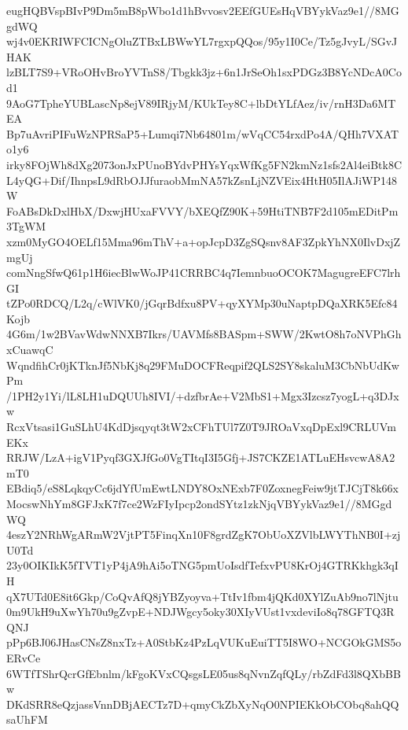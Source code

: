 eugHQBVspBIvP9Dm5mB8pWbo1d1hBvvosv2EEfGUEsHqVBYykVaz9e1//8MGgdWQ
wj4v0EKRIWFCICNgOluZTBxLBWwYL7rgxpQQos/95y1I0Ce/Tz5gJvyL/SGvJHAK
lzBLT7S9+VRoOHvBroYVTnS8/Tbgkk3jz+6n1JrSeOh1sxPDGz3B8YcNDcA0Cod1
9AoG7TpheYUBLascNp8ejV89IRjyM/KUkTey8C+lbDtYLfAez/iv/rnH3Da6MTEA
Bp7uAvriPIFuWzNPRSaP5+Lumqi7Nb64801m/wVqCC54rxdPo4A/QHh7VXATo1y6
irky8FOjWh8dXg2073onJxPUnoBYdvPHYsYqxWfKg5FN2kmNz1sfs2Al4eiBtk8C
L4yQG+Dif/IhnpsL9dRbOJJfuraobMmNA57kZsnLjNZVEix4HtH05IlAJiWP148W
FoABsDkDxlHbX/DxwjHUxaFVVY/bXEQfZ90K+59HtiTNB7F2d105mEDitPm3TgWM
xzm0MyGO4OELf15Mma96mThV+a+opJcpD3ZgSQsnv8AF3ZpkYhNX0IlvDxjZmgUj
comNngSfwQ61p1H6iecBlwWoJP41CRRBC4q7IemnbuoOCOK7MagugreEFC7lrhGI
tZPo0RDCQ/L2q/cWlVK0/jGqrBdfxu8PV+qyXYMp30uNaptpDQaXRK5Efc84Kojb
4G6m/1w2BVavWdwNNXB7Ikrs/UAVMfs8BASpm+SWW/2KwtO8h7oNVPhGhxCuawqC
WqndfihCr0jKTknJf5NbKj8q29FMuDOCFReqpif2QLS2SY8skaluM3CbNbUdKwPm
/1PH2y1Yi/lL8LH1uDQUUh8IVI/+dzfbrAe+V2MbS1+Mgx3Izcsz7yogL+q3DJxw
RcxVtsasi1GuSLhU4KdDjsqyqt3tW2xCFhTUl7Z0T9JROaVxqDpExl9CRLUVmEKx
RRJW/LzA+igV1Pyqf3GXJfGo0VgTItqI3I5Gfj+JS7CKZE1ATLuEHsvcwA8A2mT0
EBdiq5/eS8LqkqyCc6jdYfUmEwtLNDY8OxNExb7F0ZoxnegFeiw9jtTJCjT8k66x
MocswNhYm8GFJxK7f7ce2WzFIyIpcp2ondSYtz1zkNjqVBYykVaz9e1//8MGgdWQ
4eszY2NRhWgARmW2VjtPT5FinqXn10F8grdZgK7ObUoXZVlbLWYThNB0I+zjU0Td
23y0OIKIkK5fTVT1yP4jA9hAi5oTNG5pmUoIsdfTefxvPU8KrOj4GTRKkhgk3qIH
qX7UTd0E8it6Gkp/CoQvAfQ8jYBZyoyva+TtIv1fbm4jQKd0XYlZuAb9no7lNjtu
0m9UkH9uXwYh70u9gZvpE+NDJWgcy5oky30XIyVUst1vxdeviIo8q78GFTQ3RQNJ
pPp6BJ06JHasCNsZ8nxTz+A0StbKz4PzLqVUKuEuiTT5I8WO+NCGOkGMS5oERvCe
6WTfTShrQcrGfEbnlm/kFgoKVxCQsgsLE05us8qNvnZqfQLy/rbZdFd3l8QXbBBw
DKdSRR8eQzjassVnnDBjAECTz7D+qmyCkZbXyNqO0NPIEKkObCObq8ahQQsaUhFM
